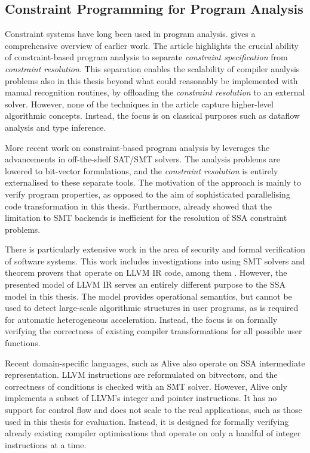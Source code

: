 \subsection{Constraint Programming for Program Analysis}

    Constraint systems have long been used in program analysis.
    \citet{Aiken:1999:ISC:339853.339897} gives a comprehensive overview of
    earlier work.
    The article highlights the crucial ability of constraint-based program
    analysis to separate {\it constraint specification} from
    {\it constraint resolution}.
    This separation enables the scalability of compiler analysis problems also
    in this thesis beyond what could reasonably be implemented with manual
    recognition routines, by offloading the {\it constraint resolution} to an
    external solver.
    However, none of the techniques in the article capture higher-level
    algorithmic concepts.
    Instead, the focus is on classical purposes such as dataflow analysis and
    type inference.

    More recent work on constraint-based program analysis by
    \citet{Gulwani:2008:PAC:1375581.1375616} leverages the advancements in
    off-the-shelf SAT/SMT solvers.
    The analysis problems are lowered to bit-vector formulations, and the
    {\it constraint resolution} is entirely externalised to these separate
    tools.
    The motivation of the approach is mainly to verify program properties,
    as opposed to the aim of sophisticated parallelising code transformation in
    this thesis.
    Furthermore,  already showed that the limitation to
    SMT backends is inefficient for the resolution of SSA constraint problems.

    There is particularly extensive work in the area of security and formal
    verification of software systems.
    This work includes investigations into using SMT solvers and theorem provers
    that operate on LLVM IR code, among them
    \citet{Zhao:2012:FLI:2103656.2103709}.
    However, the presented model of LLVM IR serves an entirely different purpose
    to the SSA model in this thesis.
    The model provides operational semantics, but cannot be used to detect
    large-scale algorithmic structures in user programs, as is required for
    automatic heterogeneous acceleration.
    Instead, the focus is on formally verifying the correctness of existing
    compiler transformations for all possible user functions.

    Recent domain-specific languages, such as Alive
    \citep{Lopes:2015:PCP:2737924.2737965} also operate on SSA intermediate
    representation.
    LLVM instructions are reformulated on bitvectors, and the
    correctness of conditions is checked with an SMT solver.
    However, Alive only implements a subset of LLVM's integer and pointer
    instructions.
    It has no support for control flow and does not scale to the real
    applications, such as those used in this thesis for evaluation.
    Instead, it is designed for formally verifying already existing
    compiler optimisations that operate on only a handful of integer
    instructions at a time.

